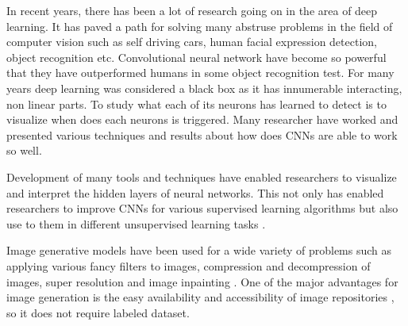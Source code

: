 
\doublespacing
{}
   
In recent years, there has been a lot of research going on in the area of deep learning. It has paved a path for solving many abstruse problems in the field of computer vision such as self driving cars, human facial expression detection\cite{1612.02903}, object recognition etc. Convolutional neural network have become so powerful that they have outperformed humans in some object recognition \cite{CNN-Better,krizhevsky2012imagenet,szegedy2015going,he2016deep,simonyan2014very} test. For many years deep learning was considered a black box as it has innumerable interacting, non linear parts. To study what each of its neurons has learned to detect is to visualize when does each neurons is triggered.  
Many researcher have worked and presented various techniques and results about how does CNNs are able to work so well. 

Development of many tools and techniques have enabled researchers to visualize and interpret the hidden layers of neural networks. This not only has enabled researchers to improve CNNs for various supervised learning algorithms but also use to them in different unsupervised learning tasks \cite{1506.06579}. 

\par

Image generative models have been used for a wide variety of problems such as applying various fancy filters to images, compression and decompression of images, super resolution \cite{1609.04802} and image inpainting \cite{1607.07539}.
 One of the major advantages for image generation is the easy availability and accessibility  of image repositories \cite{celeba} , so it does not require labeled dataset.


